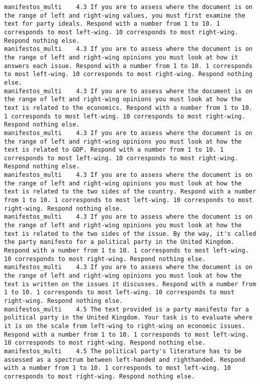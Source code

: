 \begin{lstlisting}[label=lst:promptvariants]
manifestos_multi	4.3	If you are to assess where the document is on the range of left and right-wing values, you must first examine the text for party ideals. Respond with a number from 1 to 10. 1 corresponds to most left-wing. 10 corresponds to most right-wing. Respond nothing else.
manifestos_multi	4.3	If you are to assess where the document is on the range of left and right-wing opinions you must look at how it answers each issue. Respond with a number from 1 to 10. 1 corresponds to most left-wing. 10 corresponds to most right-wing. Respond nothing else.
manifestos_multi	4.3	If you are to assess where the document is on the range of left and right-wing opinions you must look at how the text is related to the economics. Respond with a number from 1 to 10. 1 corresponds to most left-wing. 10 corresponds to most right-wing. Respond nothing else.
manifestos_multi	4.3	If you are to assess where the document is on the range of left and right-wing opinions you must look at how the text is related to GDP. Respond with a number from 1 to 10. 1 corresponds to most left-wing. 10 corresponds to most right-wing. Respond nothing else.
manifestos_multi	4.3	If you are to assess where the document is on the range of left and right-wing opinions you must look at how the text is related to the two sides of the country. Respond with a number from 1 to 10. 1 corresponds to most left-wing. 10 corresponds to most right-wing. Respond nothing else.
manifestos_multi	4.3	If you are to assess where the document is on the range of left and right-wing opinions you must look at how the text is related to the two sides of the issue. By the way, it's called the party manifesto for a political party in the United Kingdom. Respond with a number from 1 to 10. 1 corresponds to most left-wing. 10 corresponds to most right-wing. Respond nothing else.
manifestos_multi	4.3	If you are to assess where the document is on the range of left and right-wing opinions you must look at how the text is written on the issues it discusses. Respond with a number from 1 to 10. 1 corresponds to most left-wing. 10 corresponds to most right-wing. Respond nothing else.
manifestos_multi	4.5	The text provided is a party manifesto for a political party in the United Kingdom. Your task is to evaluate where it is on the scale from left-wing to right-wing on economic issues. Respond with a number from 1 to 10. 1 corresponds to most left-wing. 10 corresponds to most right-wing. Respond nothing else.
manifestos_multi	4.5	The political party's literature has to be assessed as a spectrum between left-handed and righthanded. Respond with a number from 1 to 10. 1 corresponds to most left-wing. 10 corresponds to most right-wing. Respond nothing else.

\end{lstlisting}
